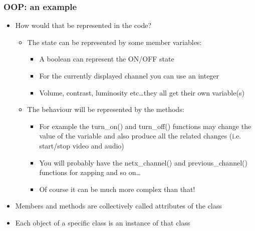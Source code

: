 \documentclass[9pt]{beamer}
\begin{document}
\begin{frame}
  \frametitle{OOP: an example}
 
  \begin{itemize}
    \item How would that be represented in the code?
    \smallskip
      \begin{itemize}
      \item The state can be represented by some member variables:
      \begin{itemize}
        \item A boolean can represent the ON/OFF state
        \item For the currently displayed channel you can use an integer
        \item Volume, contrast, luminosity etc\dots they all get their own variable(s)
      \end{itemize}

      \medskip
    
      \item The behaviour will be represented by the methods:
      \smallskip
      \begin{itemize}
        \item For example the turn\_on() and turn\_off() functions may change the value of the variable
              and also produce all the related changes (i.e. start/stop video and audio) 
        \item You will probably have the netx\_channel() and previous\_channel() functions for zapping and so on\dots
        \item Of course it can be much more complex than that!
      \end{itemize}
    \end{itemize}
    
    \medskip
    
    \item Members and methods are collectively called \alert{attributes} of the class
    \medskip
    \item Each object of a specific class is an \alert{instance} of that class
  \end{itemize}

\end{frame}
\end{document}

